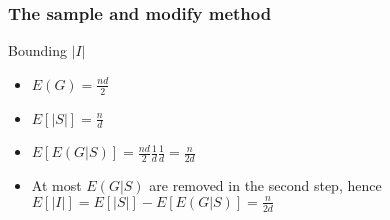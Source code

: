 \documentclass[12pt,aspectratio=169]{beamer}
\begin{document}
\begin{frame}[fragile]
\frametitle{The sample and modify method}
  \begin{block}{Bounding $|I|$}
    \begin{itemize}
    \item
      $E(G) = \frac{nd}{2}$
    \item
      $E[|S|] = \frac{n}{d}$
    \item
      $E[E(G|S)] = \frac{nd}{2}\frac{1}{d}\frac{1}{d} = \frac{n}{2d}$
    \item
      At most $E(G|S)$ are removed in the second step, hence $E[|I|] = E[|S|]- E[E(G|S)]= \frac{n}{2d}$
    \end{itemize}
  \end{block}
\end{frame}
\end{document}
